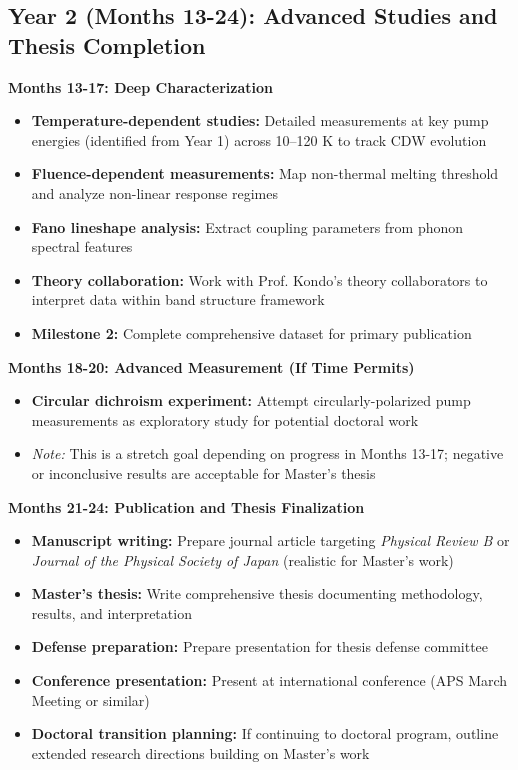 \documentclass[12pt,a4paper]{article}
\begin{document}
\subsection{Year 2 (Months 13-24): Advanced Studies and Thesis Completion}

\textbf{Months 13-17: Deep Characterization}
\begin{itemize}
    \item \textbf{Temperature-dependent studies:} Detailed measurements at key pump energies (identified from Year 1) across 10--120 K to track CDW evolution
    \item \textbf{Fluence-dependent measurements:} Map non-thermal melting threshold and analyze non-linear response regimes
    \item \textbf{Fano lineshape analysis:} Extract coupling parameters from phonon spectral features
    \item \textbf{Theory collaboration:} Work with Prof. Kondo's theory collaborators to interpret data within band structure framework
    \item \textbf{Milestone 2:} Complete comprehensive dataset for primary publication
\end{itemize}

\textbf{Months 18-20: Advanced Measurement (If Time Permits)}
\begin{itemize}
    \item \textbf{Circular dichroism experiment:} Attempt circularly-polarized pump measurements as exploratory study for potential doctoral work
    \item \textit{Note:} This is a stretch goal depending on progress in Months 13-17; negative or inconclusive results are acceptable for Master's thesis
\end{itemize}

\textbf{Months 21-24: Publication and Thesis Finalization}
\begin{itemize}
    \item \textbf{Manuscript writing:} Prepare journal article targeting \textit{Physical Review B} or \textit{Journal of the Physical Society of Japan} (realistic for Master's work)
    \item \textbf{Master's thesis:} Write comprehensive thesis documenting methodology, results, and interpretation
    \item \textbf{Defense preparation:} Prepare presentation for thesis defense committee
    \item \textbf{Conference presentation:} Present at international conference (APS March Meeting or similar)
    \item \textbf{Doctoral transition planning:} If continuing to doctoral program, outline extended research directions building on Master's work
\end{itemize}
\end{document}

